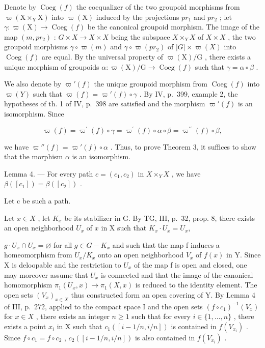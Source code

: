 Denote by \(\operatorname{Coeg}(f)\) the coequalizer of the two groupoid morphisms from \(\varpi(\mathrm{X} \times_{\mathrm{Y}} \mathrm{X})\) into \(\varpi(\mathrm{X})\) induced by the projections \(pr_{1}\) and \(pr_{2}\) ; let \(\gamma: \varpi(\mathrm{X}) \to \operatorname{Coeg}(f)\) be the canonical groupoid morphism. The image of the map \((m, pr_{2})\) : \(G \times X \to X \times X\) being the subspace \(X \times_{Y} X\) of \(X \times X\) , the two groupoid morphisms \(\gamma \circ \varpi(m)\) and \(\gamma \circ \varpi(pr_{2})\) of \(\lvert G\rvert \times \varpi(X)\) into \(\operatorname{Coeg}(f)\) are equal. By the universal property of \(\varpi(\mathrm{X})/\mathrm{G}\) , there exists a unique morphism of groupoids \(\alpha: \varpi(\mathrm{X})/\mathrm{G} \to \operatorname{Coeg}(f)\) such that \(\gamma = \alpha \circ \beta\) .

We also denote by \(\varpi'(f)\) the unique groupoid morphism from \(\operatorname{Coeg}(f)\) into \(\varpi(Y)\) such that \(\varpi(f) = \varpi'(f) \circ \gamma\) . By IV, p.~399, example 2, the hypotheses of th. 1 of IV, p.~398 are satisfied and the morphism \(\varpi'(f)\) is an isomorphism. Since

\[
\varpi (f) = \varpi^ {\prime} (f) \circ \gamma = \varpi^ {\prime} (f) \circ \alpha \circ \beta = \varpi^ {\prime \prime} (f) \circ \beta ,
\]

we have \(\varpi''(f) = \varpi'(f) \circ \alpha\) . Thus, to prove Theorem 3, it suffices to show that the morphism \(\alpha\) is an isomorphism.

Lemma 4. --- For every path \(c = (c_1, c_2)\) in \(X \times_Y X\) , we have \(\beta([c_1]) = \beta([c_2])\) .

Let c be such a path.

Let \(x \in X\) , let \(K_x\) be its stabilizer in G. By TG, III, p.~32, prop. 8, there exists an open neighborhood \(U_x\) of \(x\) in X such that \(K_x \cdot U_x = U_x\),

\(g \cdot U_x \cap U_x = \varnothing\) for all \(g \in G - K_x\) and such that the map f induces a homeomorphism from \(U_x/K_x\) onto an open neighborhood \(V_x\) of \(f(x)\) in Y. Since X is deloopable and the restriction to \(U_x\) of the map f is open and closed, one may moreover assume that \(U_x\) is connected and that the image of the canonical homomorphism \(\pi_1(U_x, x) \to \pi_1(X, x)\) is reduced to the identity element. The open sets \((V_x)_{x \in X}\) thus constructed form an open covering of Y. By Lemma 4 of III, p.~272, applied to the compact space I and the open sets \((f \circ c_1)^{-1}(V_x)\) for \(x \in X\) , there exists an integer \(n \geqslant 1\) such that for every \(i \in \{1, \ldots, n\}\) , there exists a point \(x_i\) in X such that \(c_1([i-1/n, i/n])\) is contained in \(f(V_{x_i})\) . Since \(f \circ c_1 = f \circ c_2\) , \(c_2([i-1/n, i/n])\) is also contained in \(f(V_{x_i})\) .

